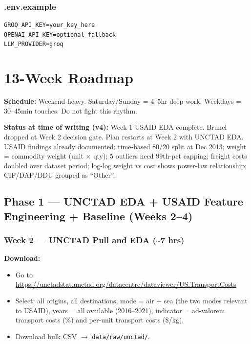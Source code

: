 \documentclass[11pt, a4paper]{article}
\begin{document}
\subsubsection{.env.example}
\begin{lstlisting}
GROQ_API_KEY=your_key_here
OPENAI_API_KEY=optional_fallback
LLM_PROVIDER=groq
\end{lstlisting}

\section{13-Week Roadmap}

\textbf{Schedule:} Weekend-heavy. Saturday/Sunday = 4--5hr deep work. Weekdays = 30--45min touches. Do not fight this rhythm.

\begin{infobox}
\textbf{Status at time of writing (v4):} Week 1 USAID EDA complete. Brunel dropped at Week 2 decision gate. Plan restarts at Week 2 with UNCTAD EDA. USAID findings already documented: time-based 80/20 split at Dec 2013; weight = commodity weight (unit $\times$ qty); 5 outliers need 99th-pct capping; freight costs doubled over dataset period; log-log weight vs cost shows power-law relationship; CIF/DAP/DDU grouped as ``Other''.
\end{infobox}

\subsection{Phase 1 --- UNCTAD EDA + USAID Feature Engineering + Baseline (Weeks 2--4)}

\subsubsection*{Week 2 --- UNCTAD Pull and EDA (\textasciitilde{}7 hrs)}

\textbf{Download:}
\begin{itemize}[noitemsep]
  \item Go to \url{https://unctadstat.unctad.org/datacentre/dataviewer/US.TransportCosts}
  \item Select: all origins, all destinations, mode = air + sea (the two modes relevant to USAID), years = all available (2016--2021), indicator = ad-valorem transport costs (\%) and per-unit transport costs (\$/kg).
  \item Download bulk CSV $\rightarrow$ \texttt{data/raw/unctad/}.
\end{itemize}
\end{document}
